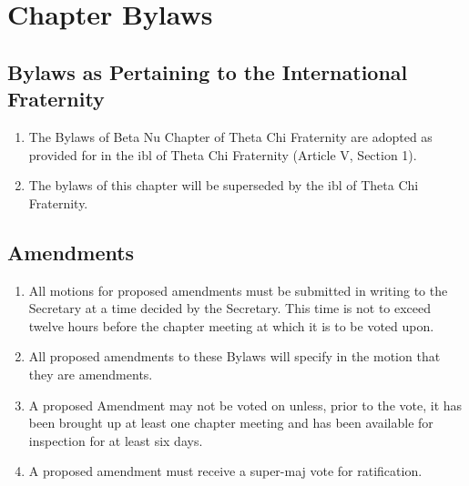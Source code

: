 \chapter{Chapter Bylaws}

\section{Bylaws as Pertaining to the International Fraternity}

	\begin{enumerate}
		\item The Bylaws of Beta Nu Chapter of Theta Chi Fraternity are adopted as provided for in the \gls{ibl} of Theta Chi Fraternity (Article V, Section 1).

		\item The bylaws of this chapter will be superseded by the \gls{ibl} of Theta Chi Fraternity.
	\end{enumerate}

\section{Amendments}
\label{bylaw-amendments}
	\begin{enumerate}
		\item All motions for proposed amendments must be submitted in writing to the Secretary at a time decided by the Secretary. This time is not to exceed twelve hours before the chapter meeting at which it is to be voted upon. \label{bylaw-time}

		\item All proposed amendments to these Bylaws will specify in the motion that they are amendments.

		\item A proposed Amendment may not be voted on unless, prior to the vote, it has been brought up at least one chapter meeting and has been available for inspection for at least six days.

		\item A proposed amendment must receive a \gls{super-maj} vote for ratification.

	\end{enumerate}

